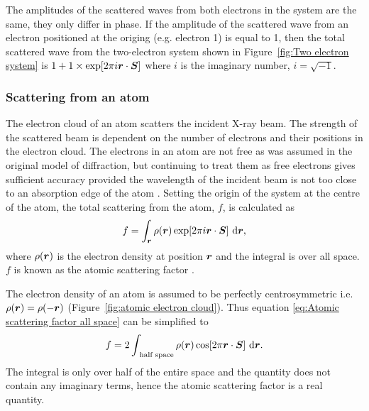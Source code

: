             The amplitudes of the scattered waves from both electrons in the system are the same, they only differ in phase.
            If the amplitude of the scattered wave from an electron positioned at the origing (e.g. electron 1) is equal to 1, then the total scattered wave from the two-electron system shown in Figure~\ref{fig:Two electron system} is $1 + 1 \times \exp[2 \pi i \boldsymbol{r} \cdot \boldsymbol{S}]$ where $i$ is the imaginary number, $i = \sqrt{-1}$.

        \subsubsection{Scattering from an atom}
        \label{subs:Scattering from an atom}
            The electron cloud of an atom scatters the incident X-ray beam.
            The strength of the scattered beam is dependent on the number of electrons and their positions in the electron cloud.
            The electrons in an atom are not free as was assumed in the original model of diffraction, but continuing to treat them as free electrons gives sufficient accuracy provided the wavelength of the incident beam is not too close to an absorption edge of the atom \cite{drenth2012}.
            Setting the origin of the system at the centre of the atom, the total scattering from the atom, $f$, is calculated as
            \begin{equation}
                f = \int_{\boldsymbol{r}} \rho(\boldsymbol{r}) \exp[2 \pi i \boldsymbol{r} \cdot \boldsymbol{S}]\ \mathrm{d}\boldsymbol{r},
                \label{eq:Atomic scattering factor all space}
            \end{equation}
            where $\rho(\boldsymbol{r})$ is the electron density at position $\boldsymbol{r}$ and the integral is over all space. $f$ is known as the atomic scattering factor \cite{drenth1999}.

            The electron density of an atom is assumed to be perfectly centrosymmetric i.e. $\rho(\boldsymbol{r}) = \rho(-\boldsymbol{r})$ (Figure~\ref{fig:atomic electron cloud}).
            Thus equation \ref{eq:Atomic scattering factor all space} can be simplified to
            \begin{equation}
                f = 2 \int_{\text{ half space}} \rho(\boldsymbol{r}) \cos[2 \pi \boldsymbol{r} \cdot \boldsymbol{S}]\ \mathrm{d}\boldsymbol{r}.
            \end{equation}
            The integral is only over half of the entire space and the quantity does not contain any imaginary terms, hence the atomic scattering factor is a real quantity.

